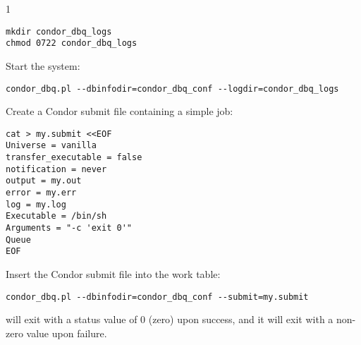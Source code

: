 \begin{ManPage}{\label{man-condor-dbq.pl}}{1}
\begin{verbatim}
mkdir condor_dbq_logs
chmod 0722 condor_dbq_logs
\end{verbatim}

Start the system:

\begin{verbatim}
condor_dbq.pl --dbinfodir=condor_dbq_conf --logdir=condor_dbq_logs
\end{verbatim}

Create a Condor submit file containing a simple job:

\begin{verbatim}
cat > my.submit <<EOF
Universe = vanilla
transfer_executable = false
notification = never
output = my.out
error = my.err
log = my.log
Executable = /bin/sh
Arguments = "-c 'exit 0'"
Queue
EOF
\end{verbatim}

Insert the Condor submit file into the work table:

\begin{verbatim}
condor_dbq.pl --dbinfodir=condor_dbq_conf --submit=my.submit
\end{verbatim}


\ExitStatus

 will exit with a status value of 0 (zero) upon success,
and it will exit with a non-zero value upon failure.


\end{ManPage}
